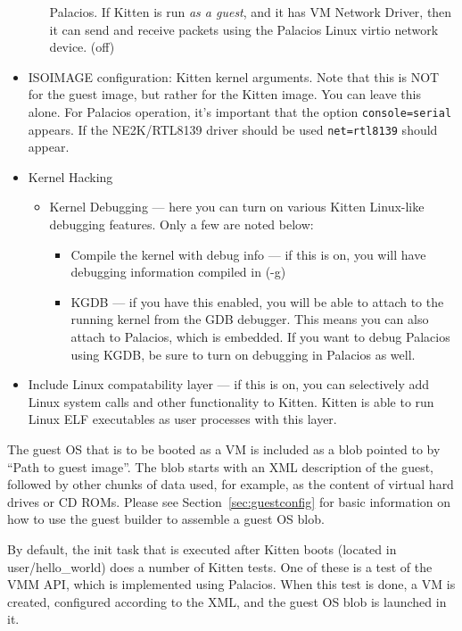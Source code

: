 \documentclass[11pt]{article}
\begin{document}
\begin{itemize}
\begin{itemize}
Palacios.  If Kitten is run {\em as a guest}, and it has VM Network
Driver, then it can send and receive packets using the Palacios Linux
virtio network device.  (off)
\end{itemize}
\item ISOIMAGE configuration:  Kitten kernel arguments.   Note that
this is NOT for the guest image, but rather for the Kitten image.  You
can leave this alone.  For Palacios operation, it's important that the
option \verb.console=serial. appears.  If the NE2K/RTL8139 driver
should be used \verb.net=rtl8139. should appear. 
\item Kernel Hacking
\begin{itemize}
\item Kernel Debugging --- here you can turn on various Kitten
Linux-like debugging features.   Only a few are noted below:
\begin{itemize}
\item Compile the kernel with debug info --- if this is on, you will
have debugging information compiled in (-g)
\item KGDB --- if you have this enabled, you will be able to attach to
the running kernel from the GDB debugger.  This means you can also
attach to Palacios, which is embedded.   If you want to debug Palacios
using KGDB, be sure to turn on debugging in Palacios as well.
\end{itemize}
\end{itemize}
\item Include Linux compatability layer --- if this is on, you can 
selectively add Linux system calls and other functionality to Kitten.
Kitten is able to run Linux ELF executables as user processes with
this layer.   
\end{itemize}

The guest OS that is to be booted as a VM is included as a blob
pointed to by ``Path to guest image''.   The blob starts with an XML
description of the guest, followed by other chunks of data used, for
example, as the content of virtual hard drives or CD ROMs.  Please see
Section~\ref{sec:guestconfig} for basic information on how to use the
guest builder to assemble a guest OS blob. 

By default, the init task that is executed after Kitten boots (located
in user/hello\_world) does a number of Kitten tests.  One of these is
a test of the VMM API, which is implemented using Palacios.  When this
test is done, a VM is created, configured according to the XML, and
the guest OS blob is launched in it.
\end{document}
